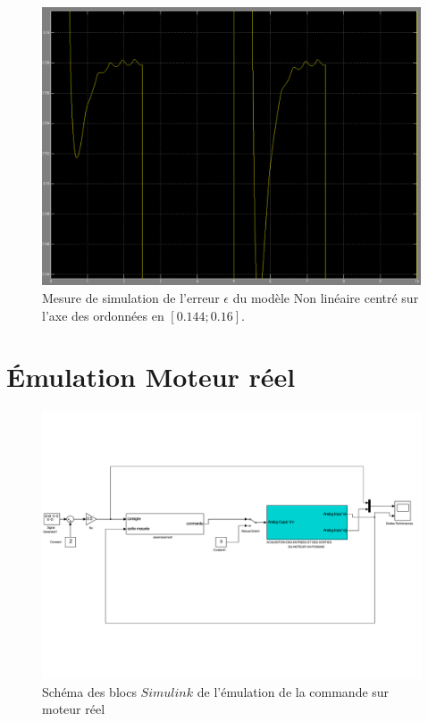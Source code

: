 \begin{figure}[!ht]
\centering
\includegraphics[width = .9\textwidth]{./annexes/annexe3/NL_erreur-Consigne_Vs_RE_zoom.png}
\caption[Mesure de simulation de l'erreur entre la référence et la sortie $V_s$ du modèle Non linéaire zoomé]{Mesure de simulation de l'erreur $\epsilon$ du modèle Non linéaire centré sur l'axe des ordonnées en $[0.144; 0.16].$\label{fig:SIMULINK_NL_erreur_reponse_zoom}}	
\end{figure}

\section*{Émulation Moteur réel}
\begin{figure}[!ht]
\includegraphics[width = \textwidth]{./annexes/annexe3/schema_MoteurReel.pdf}
\caption{Schéma des blocs $Simulink$ de l'émulation de la commande sur moteur réel\label{fig:schemaSIMU_MoteurReel}}
\end{figure}